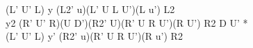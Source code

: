 (L' U' L) y (L2' u)(L' U L U')(L u') L2\\
y2 (R' U' R)(U D')(R2' U)(R' U R U')(R U') R2 D U' *\\
(L' U' L) y' (R2' u)(R' U R U')(R u') R2\\
